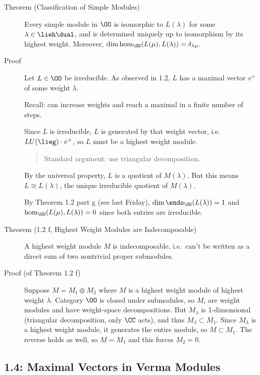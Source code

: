 \begin{description}
\item[Theorem (Classification of Simple Modules)]
Every simple module in \(\OO\) is isomorphic to \(L(\lambda)\) for some
\(\lambda \in \lieh\dual\), and is determined uniquely up to isomorphism
by its highest weight. Moreover,
\(\dim \hom_\OO(L(\mu), L(\lambda)) = \delta_{\lambda \mu}\).
\item[Proof]
Let \(L \in \OO\) be irreducible. As observed in 1.2, \(L\) has a
maximal vector \(v^+\) of some weight \(\lambda\).

Recall: can increase weights and reach a maximal in a finite number of
steps.

Since \(L\) is irreducible, \(L\) is generated by that weight vector,
i.e.~\(L U(\lieg) \cdot v^+\), so \(L\) must be a highest weight module.

\begin{quote}
Standard argument: use triangular decomposition.
\end{quote}

By the universal property, \(L\) is a quotient of \(M(\lambda)\). But
this means \(L \cong L(\lambda)\), the unique irreducible quotient of
\(M(\lambda)\).

By Theorem 1.2 part g (see last Friday),
\(\dim \endo_\OO(L(\lambda)) = 1\) and
\(\hom_\OO(L(\mu), L(\lambda)) = 0\) since both entries are irreducible.
\item[Theorem (1.2 f, Highest Weight Modules are Indecomposable)]
A highest weight module \(M\) is indecomposable, i.e.~can't be written
as a direct sum of two nontrivial proper submodules.
\item[Proof (of Theorem 1.2 f)]
Suppose \(M = M_1 \oplus M_2\) where \(M\) is a highest weight module of
highest weight \(\lambda\). Category \(\OO\) is closed under submodules,
so \(M_i\) are weight modules and have weight-space decompositions. But
\(M_\lambda\) is 1-dimensional (triangular decomposition, only \(\CC\)
acts), and thus \(M_\lambda \subset M_1\). Since \(M_\lambda\) is a
highest weight module, it generates the entire module, so
\(M \subset M_1\). The reverse holds as well, so \(M = M_1\) and this
forces \(M_2 = 0\).
\end{description}

\hypertarget{maximal-vectors-in-verma-modules}{%
\subsection{1.4: Maximal Vectors in Verma
Modules}\label{maximal-vectors-in-verma-modules}}

